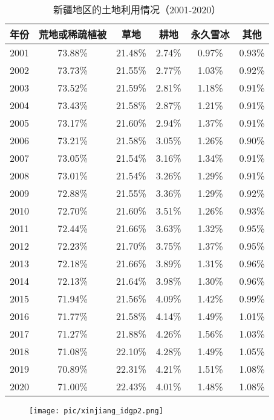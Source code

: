 \documentclass{article}
\begin{document}
		\begin{table}[H]
			\centering
			\begin{tabular}{|c|c|c|c|c|c|}
				\hline
				年份 & 荒地或稀疏植被 & 草地 & 耕地 & 永久雪冰 & 其他 \\
				\hline
				2001 & 73.88\% & 21.48\% & 2.74\% & 0.97\% & 0.93\% \\
				2002 & 73.73\% & 21.55\% & 2.77\% & 1.03\% & 0.92\% \\
				2003 & 73.52\% & 21.59\% & 2.81\% & 1.18\% & 0.91\% \\
				2004 & 73.43\% & 21.58\% & 2.87\% & 1.21\% & 0.91\% \\
				2005 & 73.17\% & 21.60\% & 2.94\% & 1.37\% & 0.91\% \\
				2006 & 73.21\% & 21.58\% & 3.05\% & 1.26\% & 0.90\% \\
				2007 & 73.05\% & 21.54\% & 3.16\% & 1.34\% & 0.91\% \\
				2008 & 73.01\% & 21.54\% & 3.26\% & 1.29\% & 0.91\% \\
				2009 & 72.88\% & 21.55\% & 3.36\% & 1.29\% & 0.92\% \\
				2010 & 72.70\% & 21.60\% & 3.51\% & 1.26\% & 0.93\% \\
				2011 & 72.44\% & 21.66\% & 3.63\% & 1.32\% & 0.95\% \\
				2012 & 72.23\% & 21.70\% & 3.75\% & 1.37\% & 0.95\% \\
				2013 & 72.18\% & 21.66\% & 3.89\% & 1.31\% & 0.96\% \\
				2014 & 72.13\% & 21.64\% & 3.98\% & 1.30\% & 0.96\% \\
				2015 & 71.94\% & 21.56\% & 4.09\% & 1.42\% & 0.99\% \\
				2016 & 71.77\% & 21.58\% & 4.14\% & 1.49\% & 1.01\% \\
				2017 & 71.27\% & 21.88\% & 4.26\% & 1.56\% & 1.03\% \\
				2018 & 71.08\% & 22.10\% & 4.28\% & 1.49\% & 1.05\% \\
				2019 & 70.89\% & 22.31\% & 4.21\% & 1.51\% & 1.08\% \\
				2020 & 71.00\% & 22.43\% & 4.01\% & 1.48\% & 1.08\% \\
				\hline
			\end{tabular}
			\caption{新疆地区的土地利用情况（2001-2020）}
		\end{table}
		
		
				
		\begin{figure}[H]  %
			\centering
			\texttt{[image: pic/xinjiang\_idgp2.png]} %
		\end{figure}
		
\end{document}
